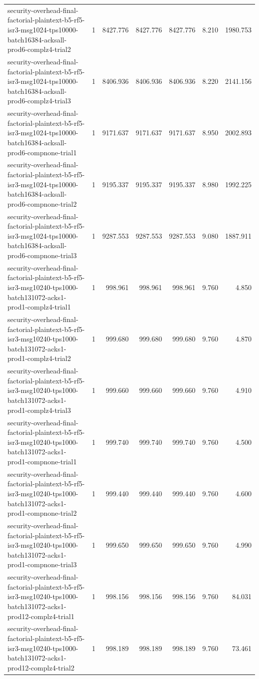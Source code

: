 \begin{tabular}{lrrrrrr}
security-overhead-final-factorial-plaintext-b5-rf5-isr3-msg1024-tps10000-batch16384-acksall-prod6-complz4-trial2 & 1 & 8427.776 & 8427.776 & 8427.776 & 8.210 & 1980.753 \\
security-overhead-final-factorial-plaintext-b5-rf5-isr3-msg1024-tps10000-batch16384-acksall-prod6-complz4-trial3 & 1 & 8406.936 & 8406.936 & 8406.936 & 8.220 & 2141.156 \\
security-overhead-final-factorial-plaintext-b5-rf5-isr3-msg1024-tps10000-batch16384-acksall-prod6-compnone-trial1 & 1 & 9171.637 & 9171.637 & 9171.637 & 8.950 & 2002.893 \\
security-overhead-final-factorial-plaintext-b5-rf5-isr3-msg1024-tps10000-batch16384-acksall-prod6-compnone-trial2 & 1 & 9195.337 & 9195.337 & 9195.337 & 8.980 & 1992.225 \\
security-overhead-final-factorial-plaintext-b5-rf5-isr3-msg1024-tps10000-batch16384-acksall-prod6-compnone-trial3 & 1 & 9287.553 & 9287.553 & 9287.553 & 9.080 & 1887.911 \\
security-overhead-final-factorial-plaintext-b5-rf5-isr3-msg10240-tps1000-batch131072-acks1-prod1-complz4-trial1 & 1 & 998.961 & 998.961 & 998.961 & 9.760 & 4.850 \\
security-overhead-final-factorial-plaintext-b5-rf5-isr3-msg10240-tps1000-batch131072-acks1-prod1-complz4-trial2 & 1 & 999.680 & 999.680 & 999.680 & 9.760 & 4.870 \\
security-overhead-final-factorial-plaintext-b5-rf5-isr3-msg10240-tps1000-batch131072-acks1-prod1-complz4-trial3 & 1 & 999.660 & 999.660 & 999.660 & 9.760 & 4.910 \\
security-overhead-final-factorial-plaintext-b5-rf5-isr3-msg10240-tps1000-batch131072-acks1-prod1-compnone-trial1 & 1 & 999.740 & 999.740 & 999.740 & 9.760 & 4.500 \\
security-overhead-final-factorial-plaintext-b5-rf5-isr3-msg10240-tps1000-batch131072-acks1-prod1-compnone-trial2 & 1 & 999.440 & 999.440 & 999.440 & 9.760 & 4.600 \\
security-overhead-final-factorial-plaintext-b5-rf5-isr3-msg10240-tps1000-batch131072-acks1-prod1-compnone-trial3 & 1 & 999.650 & 999.650 & 999.650 & 9.760 & 4.990 \\
security-overhead-final-factorial-plaintext-b5-rf5-isr3-msg10240-tps1000-batch131072-acks1-prod12-complz4-trial1 & 1 & 998.156 & 998.156 & 998.156 & 9.760 & 84.031 \\
security-overhead-final-factorial-plaintext-b5-rf5-isr3-msg10240-tps1000-batch131072-acks1-prod12-complz4-trial2 & 1 & 998.189 & 998.189 & 998.189 & 9.760 & 73.461 \\

\end{tabular}
